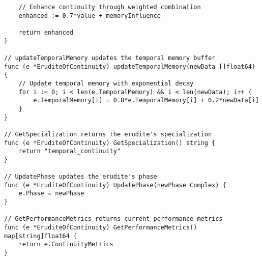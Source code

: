 \begin{tcolorbox}[colback=CodeBackground, colframe=DarkGray, title=Erudite of Continuity Implementation, fonttitle=\bfseries]
\begin{verbatim}
    // Enhance continuity through weighted combination
    enhanced := 0.7*value + memoryInfluence
    
    return enhanced
}

// updateTemporalMemory updates the temporal memory buffer
func (e *EruditeOfContinuity) updateTemporalMemory(newData []float64) {
    // Update temporal memory with exponential decay
    for i := 0; i < len(e.TemporalMemory) && i < len(newData); i++ {
        e.TemporalMemory[i] = 0.8*e.TemporalMemory[i] + 0.2*newData[i]
    }
}

// GetSpecialization returns the erudite's specialization
func (e *EruditeOfContinuity) GetSpecialization() string {
    return "temporal_continuity"
}

// UpdatePhase updates the erudite's phase
func (e *EruditeOfContinuity) UpdatePhase(newPhase Complex) {
    e.Phase = newPhase
}

// GetPerformanceMetrics returns current performance metrics
func (e *EruditeOfContinuity) GetPerformanceMetrics() map[string]float64 {
    return e.ContinuityMetrics
}
\end{verbatim}
\end{tcolorbox}

